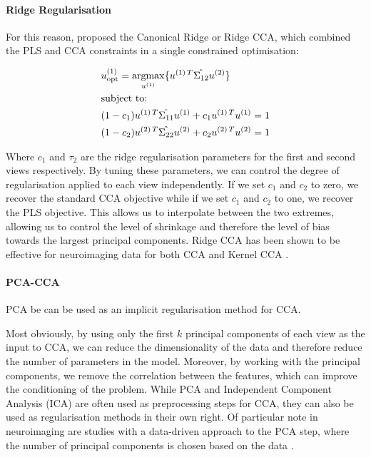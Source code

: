 \paragraph{Ridge Regularisation} For this reason, \citet{vinod1976canonical} proposed the Canonical Ridge or Ridge CCA, which combined the PLS and CCA constraints in a single constrained optimisation:

\begin{align}
    & u^{(1)}_{\text{opt}} = \underset{u^{(1)}}{\mathrm{argmax}} \{ u^{(1)\,T} \hat{\Sigma_{12}} u^{(2)} \} \\
    & \text{subject to:} \notag \\
    & (1 - c_1) u^{(1)\,T} \hat{\Sigma_{11}} u^{(1)} + c_1 u^{(1)\,T} u^{(1)} = 1 \notag \\
    & (1 - c_2) u^{(2)\,T} \hat{\Sigma_{22}} u^{(2)} + c_2 u^{(2)\,T} u^{(2)} = 1 \notag
\end{align}

Where $c_1$ and $\tau_2$ are the ridge regularisation parameters for the first and second views respectively.
By tuning these parameters, we can control the degree of regularisation applied to each view independently.
If we set $c_1$ and $c_2$ to zero, we recover the standard CCA objective while if we set $c_1$ and $c_2$ to one, we recover the PLS objective.
This allows us to interpolate between the two extremes, allowing us to control the level of shrinkage and therefore the level of bias towards the largest principal components. Ridge CCA has been shown to be effective for neuroimaging data for both CCA \citep{tenenhaus2011regularized, tuzhilina2023canonical, hardoon2004canonical} and Kernel CCA \citep{hardoon2007unsupervised}.

\paragraph{PCA-CCA} PCA be can be used as an implicit regularisation method for CCA.

Most obviously, by using only the first \( k \) principal components of each view as the input to CCA, we can reduce the dimensionality of the data and therefore reduce the number of parameters in the model.
Moreover, by working with the principal components, we remove the correlation between the features, which can improve the conditioning of the problem.
While PCA and Independent Component Analysis (ICA) are often used as preprocessing steps for CCA, they can also be used as regularisation methods in their own right.
Of particular note in neuroimaging are studies with a data-driven approach to the PCA step, where the number of principal components is chosen based on the data \citep{liu2022improved, mihalik_canonical_2022}.

